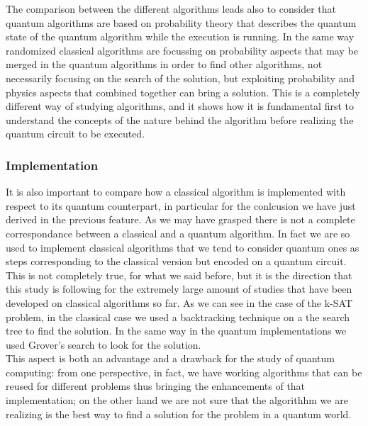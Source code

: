 \documentclass[english]{article}
\begin{document}
				The comparison between the different algorithms leads also to consider that quantum algorithms are based on probability theory that describes the quantum state of the quantum algorithm while the execution is running. In the same way randomized classical algorithms are focussing on probability aspects that may be merged in the quantum algorithms in order to find other algorithms, not necessarily focusing on the search of the solution, but exploiting probability and physics aspects that combined together can bring a solution. This is a completely different way of studying algorithms, and it shows how it is fundamental first to understand the concepts of the nature behind the algorithm before realizing the quantum circuit to be executed. 
			
			\subsubsection{Implementation}
			\label{sec:implementationComparison}
				It is also important to compare how a classical algorithm is implemented with respect to its quantum counterpart, in particular for the conlcusion we have just derived in the previous feature. As we may have grasped there is not a complete correspondance between a classical and a quantum algorithm. In fact we are so used to implement classical algorithms that we tend to consider quantum ones as steps corresponding to the classical version but encoded on a quantum circuit. This is not completely true, for what we said before, but it is the direction that this study is following for the extremely large amount of studies that have been developed on classical algorithms so far. As we can see in the case of the k-SAT problem, in the classical case we used a backtracking technique on a the search tree to find the solution. In the same way in the quantum implementations we used Grover's search to look for the solution. \\
				
				This aspect is both an advantage and a drawback for the study of quantum computing: from one perspective, in fact, we have working algorithms that can be reused for different problems thus bringing the enhancements of that implementation; on the other hand we are not sure that the algorithhm we are realizing is the best way to find a solution for the problem in a quantum world. 
				
\end{document}
